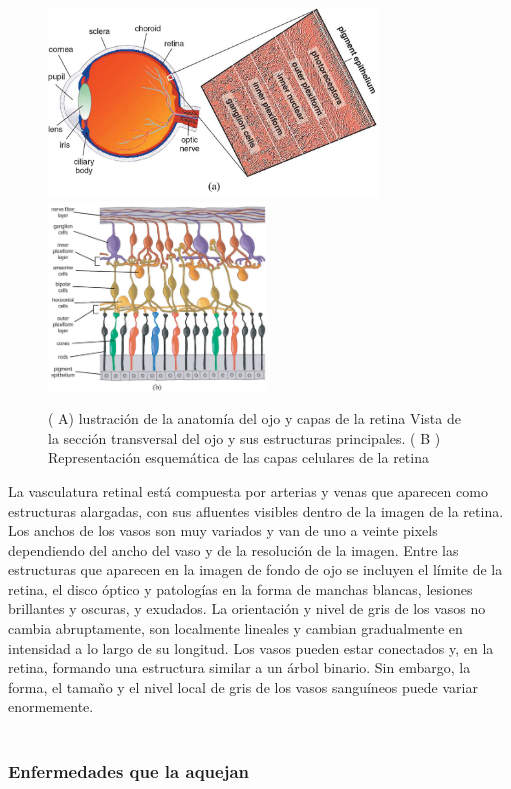 \begin{figure}[H]
\centering
\includegraphics[height=5cm]{./Figures/retina_a.png}
\includegraphics[height=5cm]{./Figures/retina_b.png}
\label{fig:retina}
\caption{( A) lustración de la anatomía del ojo y capas de la retina  Vista de la sección transversal
del ojo y sus estructuras principales. ( B ) Representación esquemática de las capas celulares de la retina}
\end{figure}

La vasculatura retinal está compuesta por arterias y venas que aparecen como estructuras alargadas, con sus afluentes visibles dentro de la imagen de la retina.
Los anchos de los vasos son muy variados y van de uno a veinte pixels dependiendo del ancho del vaso y de la resolución de la imagen.
Entre las estructuras que aparecen en la imagen de fondo de ojo se incluyen el límite de la retina, el disco óptico y patologías en la forma de manchas blancas, lesiones brillantes y oscuras, y exudados.
La orientación y nivel de gris de los vasos no cambia abruptamente, son localmente lineales y cambian gradualmente en intensidad a lo largo de su longitud. Los vasos pueden estar conectados y, en la retina, formando una estructura similar a un árbol binario. Sin embargo, la forma, el tamaño y el nivel local de gris de los vasos sanguíneos puede variar enormemente.\cite{fraz2012blood}\\
\\

			\subsubsection{Enfermedades que la aquejan}
			
